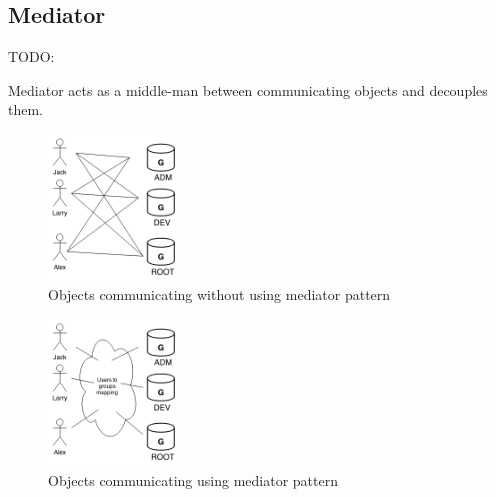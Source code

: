 \begin{multicols}{2}
\subsection{Mediator}\label{ssection:mediator}

TODO:

Mediator acts as a middle-man between communicating objects and decouples them\cite{sm-mediator}.

\begin{figure}[H]
	\centering
	\includegraphics[width=0.3\textwidth]{assets/mediator_before}
	\caption{Objects communicating without using mediator pattern}
	\label{fig:mediator-before}
\end{figure}

\begin{figure}[H]
	\centering
	\includegraphics[width=0.3\textwidth]{assets/mediator_after}
	\caption{Objects communicating using mediator pattern}
	\label{fig:mediator-after}
\end{figure}


\end{multicols}
